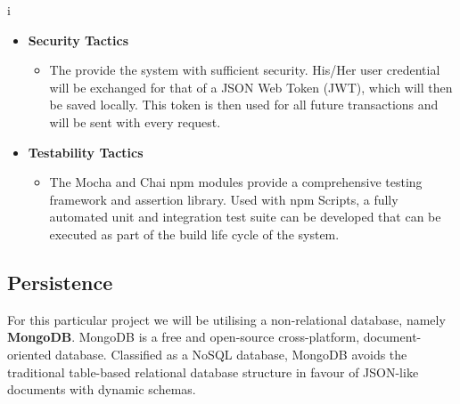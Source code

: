 i\documentclass[a4paper,12pt]{article}
\begin{document}
\begin{itemize}
		\item\textbf{Security Tactics}
		\begin{itemize}
			\item The provide the system with sufficient security. His/Her user credential will be exchanged for that of a JSON Web Token (JWT), which will then be saved locally. This token is then used for all future transactions and will be sent with every request.
		\end{itemize}
		
		\newpage
		\item\textbf{Testability Tactics}
		\begin{itemize}
			\item The Mocha and Chai npm modules provide a comprehensive testing framework and assertion library. Used with npm Scripts, a fully automated unit and integration test suite can be developed that can be executed as part of the build life cycle of the system. 
		\end{itemize}
		
	\end{itemize}
	
	\newpage
	\subsection{Persistence}
	For this particular project we will be utilising a non-relational database, namely \textbf{MongoDB}. MongoDB is a free and open-source cross-platform, document-oriented database. Classified as a NoSQL database, MongoDB avoids the traditional table-based relational database structure in favour of JSON-like documents with dynamic schemas. 
	
\end{document}
